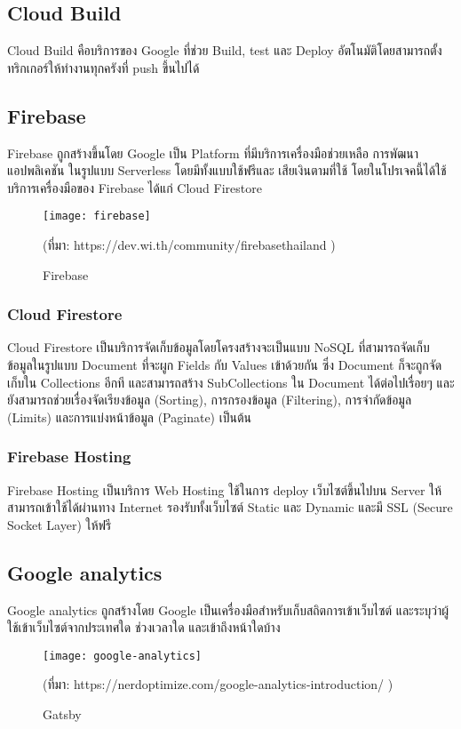 \subsection{Cloud Build}
Cloud Build คือบริการของ Google ที่ช่วย Build, test และ Deploy อัตโนมัติโดยสามารถตั้งทริกเกอร์ให้ทำงานทุกครังที่ push ขึ้นไปได้
\subsection{Firebase}
Firebase ถูกสร้างขึ้นโดย Google เป็น Platform ที่มีบริการเครื่องมือช่วยเหลือ การพัฒนาแอปพลิเคชัน ในรูปแบบ Serverless โดยมีทั้งแบบใช้ฟรีและ เสียเงินตามที่ใช้ โดยในโปรเจคนี้ได้ใช้บริการเครื่องมือของ Firebase ได้แก่ Cloud Firestore
\begin{figure}[!h]
	\centering
	\texttt{[image: firebase]}
	\caption{Firebase}
	(ที่มา: 
	https://dev.wi.th/community/firebasethailand
	)
	\label{Fig:firebase}
\end{figure}
\subsubsection{Cloud Firestore}
Cloud Firestore เป็นบริการจัดเก็บข้อมูลโดยโครงสร้างจะเป็นแบบ NoSQL ที่สามารถจัดเก็บข้อมูลในรูปแบบ Document ที่จะผูก Fields กับ Values เข้าด้วยกัน
ซึ่ง Document ก็จะถูกจัดเก็บใน Collections อีกที และสามารถสร้าง SubCollections ใน Document ได้ต่อไปเรื่อยๆ และยังสามารถช่วยเรื่องจัดเรียงข้อมูล (Sorting), การกรองข้อมูล (Filtering), การจำกัดข้อมูล (Limits) และการแบ่งหน้าข้อมูล (Paginate) เป็นต้น
\subsubsection{Firebase Hosting}
Firebase Hosting เป็นบริการ Web Hosting ใช้ในการ deploy เว็บไซต์ขึ้นไปบน Server ให้สามารถเข้าใช้ได้ผ่านทาง Internet รองรับทั้งเว็บไซต์ Static และ Dynamic และมี SSL (Secure Socket Layer) ให้ฟรี

\subsection{Google analytics}
Google analytics ถูกสร้างโดย Google เป็นเครื่องมือสำหรับเก็บสถิตการเข้าเว็บไซต์ และระบุว่าผู้ใช้เข้าเว็บไซต์จากประเทศใด ช่วงเวลาใด และเข้าถึงหน้าใดบ้าง
\begin{figure}[!h]
	\centering
	\texttt{[image: google-analytics]}
	\caption{Gatsby}
	(ที่มา: 
	https://nerdoptimize.com/google-analytics-introduction/
	)
	\label{Fig:gatsby}
\end{figure}

